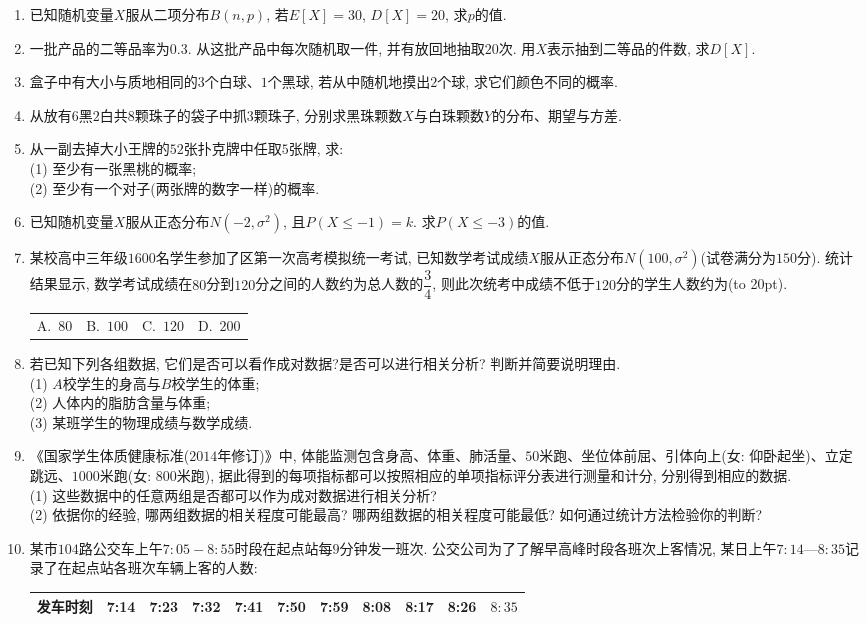 \documentclass[10pt,a4paper]{article}
\newcommand{\bracket}[1]{(\hbox to #1pt{})}
\newcommand{\fourch}[4]{\par\begin{tabular}{p{.23\textwidth}p{.23\textwidth}p{.23\textwidth}p{.23\textwidth}}
A.~#1 &B.~#2& C.~#3& D.~#4
\end{tabular}}
\begin{document}
\begin{enumerate}[1.]
\item 已知随机变量$X$服从二项分布$B(n,p)$, 若$E[X]=30$, $D[X]=20$, 求$p$的值.
\item 一批产品的二等品率为$0.3$. 从这批产品中每次随机取一件, 并有放回地抽取$20$次. 用$X$表示抽到二等品的件数, 求$D[X]$. 
\item 盒子中有大小与质地相同的$3$个白球、$1$个黑球, 若从中随机地摸出$2$个球, 求它们颜色不同的概率.
\item 从放有$6$黑$2$白共$8$颗珠子的袋子中抓$3$颗珠子, 分别求黑珠颗数$X$与白珠颗数$Y$的分布、期望与方差.
\item 从一副去掉大小王牌的$52$张扑克牌中任取$5$张牌, 求:\\
(1) 至少有一张黑桃的概率;\\
(2) 至少有一个对子(两张牌的数字一样)的概率. 
\item 已知随机变量$X$服从正态分布$N(-2, \sigma^2)$, 且$P(X\le -1)=k$. 求$P(X\le -3)$的值.
\item 某校高中三年级$1600$名学生参加了区第一次高考模拟统一考试, 已知数学考试成绩$X$服从正态分布$N(100, \sigma^2)$(试卷满分为$150$分). 统计结果显示, 数学考试成绩在$80$分到$120$分之间的人数约为总人数的$\dfrac 34$, 则此次统考中成绩不低于$120$分的学生人数约为\bracket{20}.
\fourch{$80$}{$100$}{$120$}{$200$} 
\item 若已知下列各组数据, 它们是否可以看作成对数据?是否可以进行相关分析? 判断并简要说明理由.\\
(1) $A$校学生的身高与$B$校学生的体重;\\
(2) 人体内的脂肪含量与体重;\\
(3) 某班学生的物理成绩与数学成绩.
\item 《国家学生体质健康标准($2014$年修订)》中, 体能监测包含身高、体重、肺活量、$50$米跑、坐位体前屈、引体向上(女: 仰卧起坐)、立定跳远、$1000$米跑(女: $800$米跑),
据此得到的每项指标都可以按照相应的单项指标评分表进行测量和计分, 分别得到相应的数据.\\
(1) 这些数据中的任意两组是否都可以作为成对数据进行相关分析?\\
(2) 依据你的经验, 哪两组数据的相关程度可能最高? 哪两组数据的相关程度可能最低? 如何通过统计方法检验你的判断?
\item 某市$104$路公交车上午$7:05-8:55$时段在起点站每$9$分钟发一班次. 公交公司为了了解早高峰时段各班次上客情况, 某日上午$7:14—8:35$记录了在起点站各班次车辆上客的人数:
\begin{center}
\begin{tabular}{|c|c|c|c|c|c|c|c|c|c|c|}
\hline
发车时刻 & 7:14  & 7:23  & 7:32  & 7:41  & 7:50  & 7:59  & 8:08  & 8:17  & 8:26  & $8:35$ \\ \hline

\end{tabular}
\end{center}
\end{enumerate}
\end{document}

